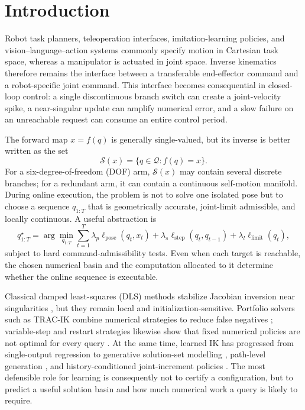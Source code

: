 \documentclass[10pt,a4paper]{article}
\begin{document}
\section{Introduction}

Robot task planners, teleoperation interfaces, imitation-learning policies, and
vision--language--action systems commonly specify motion in Cartesian task space,
whereas a manipulator is actuated in joint space. Inverse kinematics therefore remains
the interface between a transferable end-effector command and a robot-specific joint
command. This interface becomes consequential in closed-loop control: a single
discontinuous branch switch can create a joint-velocity spike, a near-singular update
can amplify numerical error, and a slow failure on an unreachable request can consume
an entire control period.

The forward map $x=f(q)$ is generally single-valued, but its inverse is better written
as the set
\begin{equation}
  \mathcal{S}(x)=\{q\in\mathcal{Q}: f(q)=x\}.
\end{equation}
For a six-degree-of-freedom (DOF) arm, $\mathcal{S}(x)$ may contain several discrete
branches; for a redundant arm, it can contain a continuous self-motion manifold.
During online execution, the problem is not to solve one isolated pose but to choose a
sequence $q_{1:T}$ that is geometrically accurate, joint-limit admissible, and locally
continuous. A useful abstraction is
\begin{equation}
q_{1:T}^{\star}=\arg\min_{q_{1:T}}\sum_{t=1}^{T}
  \lambda_p\ell_{\mathrm{pose}}(q_t,x_t)
 +\lambda_s\ell_{\mathrm{step}}(q_t,q_{t-1})
 +\lambda_l\ell_{\mathrm{limit}}(q_t),
\end{equation}
subject to hard command-admissibility tests. Even when each target is reachable, the
chosen numerical basin and the computation allocated to it determine whether the
online sequence is executable.

Classical damped least-squares (DLS) methods stabilize Jacobian inversion near
singularities \cite{wampler1986dls,nakamura1986singularity,chiaverini1994review}, but
they remain local and initialization-sensitive. Portfolio solvers such as TRAC-IK
combine numerical strategies to reduce false negatives \cite{beeson2015tracik};
variable-step and restart strategies likewise show that fixed numerical policies are
not optimal for every query \cite{colan2024variablestep}. At the same time, learned IK
has progressed from single-output regression to generative solution-set modelling
\cite{ames2022ikflow,limoyo2025ggik}, path-level generation
\cite{morgan2024cppflow}, and history-conditioned joint-increment policies
\cite{yang2026mimik}. The most defensible role for learning is consequently not to
certify a configuration, but to predict a useful solution basin and how much numerical
work a query is likely to require.
\end{document}
